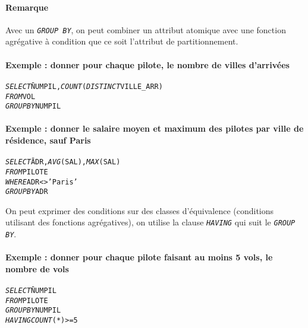 \documentclass[10pt]{article}
\begin{document}
			\paragraph{Remarque} Avec un \emph{\texttt{GROUP BY}}, on peut combiner un attribut atomique avec une fonction agrégative à condition que ce soit l'attribut de partitionnement.
			
			\paragraph{Exemple : donner pour chaque pilote, le nombre de villes d'arrivées}
				\begin{alltt}
					\begin{tabbing}
						\emph{SELECT} \= NUMPIL, \emph{COUNT}(\emph{DISTINCT} VILLE_ARR)\\
						\emph{FROM} \> VOL\\
						\emph{GROUP BY} \> NUMPIL
					\end{tabbing}
				\end{alltt}
				
			\paragraph{Exemple : donner le salaire moyen et maximum des pilotes par ville de résidence, sauf Paris}
				\begin{alltt}
					\begin{tabbing}
						\emph{SELECT} \= ADR, \emph{AVG}(SAL), \emph{MAX}(SAL)\\
						\emph{FROM} \> PILOTE\\
						\emph{WHERE} \> ADR<>'Paris'\\
						\emph{GROUP BY} \> ADR
					\end{tabbing}
				\end{alltt}
				
			On peut exprimer des conditions sur des classes d'équivalence (conditions utilisant des fonctions agrégatives), on utilise la clause \emph{\texttt{HAVING}} qui suit le \emph{\texttt{GROUP BY}}.\index{HAVING}
			
			\paragraph{Exemple : donner pour chaque pilote faisant au moins 5 vols, le nombre de vols}
			\begin{alltt}
					\begin{tabbing}
						\emph{SELECT} \= NUMPIL\\
						\emph{FROM} \> PILOTE\\
						\emph{GROUP BY} \> NUMPIL\\
						\emph{HAVING} \> \emph{COUNT}(*)>=5
					\end{tabbing}
				\end{alltt}
				
\end{document}
